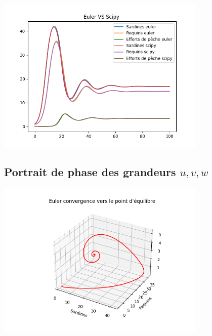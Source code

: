 \documentclass[a4paper, 11pt]{report}%
\begin{document}
        \begin{center}
            \includegraphics[width=10cm]{figures/Euler_VS_Scipy_good_conditions.png}
        \end{center}

        \subsection{Portrait de phase des grandeurs $u,v,w$}
        \begin{center}
            \includegraphics[width=10cm]{figures/convergence_3d_point_equilibre.png}
        \end{center}
\end{document}

